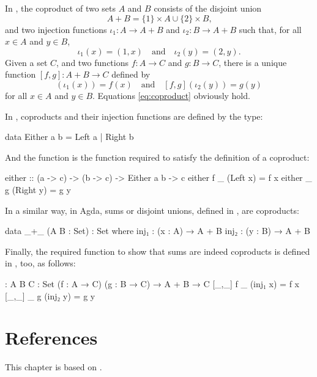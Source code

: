 \begin{example}
  \label{ex:coproduct-set}


  In \set, the coproduct of two sets $A$ and $B$ consists of the
  disjoint union
  \begin{equation}
    A + B = \{1\} \times A \cup \{2\} \times B
    \text{,}
  \end{equation}
  and two injection functions $\iota_{1}: A \to A + B$ and $\iota_{2}:
  B \to A + B$ such that, for all $x \in A$ and $y \in B$,
  \begin{equation}
    \iota_{1}(x) = (1,x)
    \quad
    \text{and}
    \quad
    \iota_{2}(y) = (2,y)
    \text{.}
  \end{equation}
  Given a set $C$, and two functions $f: A \to C$ and $g: B \to C$,
  there is a unique function $[f,g]: A + B \to C$ defined by
  \begin{equation}
    [f,g](\iota_{1}(x)) = f(x)
    \quad
    \text{and}
    \quad
    [f,g](\iota_{2}(y)) = g(y)
  \end{equation}
  for all $x \in A$ and $y \in B$. Equations \eqref{eq:coproduct}
  obviously hold.

\end{example}

\begin{example}
  \label{ex:coproduct-haskell}

  In \hask, coproducts and their injection functions are defined by
  the  type:
  \begin{codehaskell}
data Either a b = Left a | Right b
  \end{codehaskell}
  And the  function is the function required to
  satisfy the definition of a coproduct:
  \begin{codehaskell}
either :: (a -> c) -> (b -> c) -> Either a b -> c
either f _ (Left x)  = f x
either _ g (Right y) = g y
  \end{codehaskell}

\end{example}

\begin{example}
  \label{ex:coproduct-agda}

  In a similar way, in Agda, sums or disjoint unions, defined in
  , are coproducts:
  \begin{codeagda}
data _+_ (A B : Set) : Set where
  inj₁ : (x : A) → A + B
  inj₂ : (y : B) → A + B
  \end{codeagda}
  Finally, the required function to show that sums are indeed
  coproducts is defined in , too, as follows:
  \begin{codeagda}
[_,_] : {A B C : Set} (f : A → C) (g : B → C) → A + B → C
[_,_] f _ (inj₁ x) = f x
[_,_] _ g (inj₂ y) = g y
  \end{codeagda}

\end{example}

\section{References}
\label{sec:constructions-references}

This chapter is based on \parencites[15--19]{pierce-1991}[439--440,
  444]{poigne-1992}[63]{maclane-1998}.

\clearemptydoublepage
